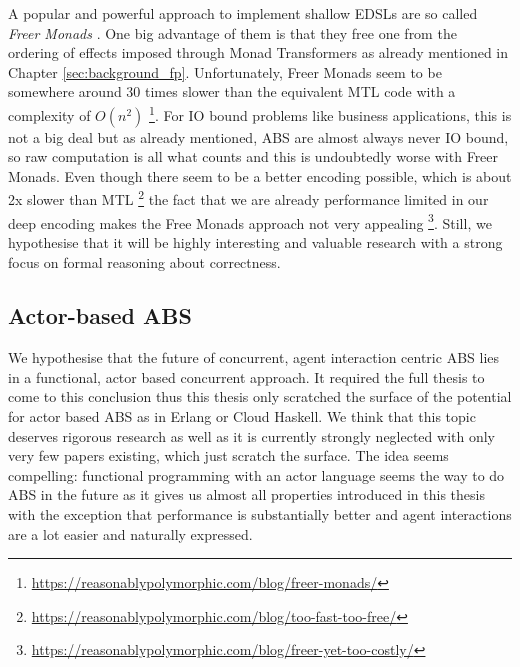 \medskip

A popular and powerful approach to implement shallow EDSLs are so called \textit{Freer Monads} \cite{rivas_notions_2014}. One big advantage of them is that they free one from the ordering of effects imposed through Monad Transformers as already mentioned in Chapter \ref{sec:background_fp}. Unfortunately, Freer Monads seem to be somewhere around 30 times slower than the equivalent MTL code with a complexity of $O(n^2)$ \footnote{\url{https://reasonablypolymorphic.com/blog/freer-monads/}}. For IO bound problems like business applications, this is not a big deal but as already mentioned, ABS are almost always never IO bound, so raw computation is all what counts and this is undoubtedly worse with Freer Monads. Even though there seem to be a better encoding possible, which is about 2x slower than MTL \footnote{\url{https://reasonablypolymorphic.com/blog/too-fast-too-free/}} the fact that we are already performance limited in our deep encoding makes the Free Monads approach not very appealing \footnote{\url{https://reasonablypolymorphic.com/blog/freer-yet-too-costly/}}. Still, we hypothesise that it will be highly interesting and valuable research with a strong focus on formal reasoning about correctness.



\subsection{Actor-based ABS}
We hypothesise that the future of concurrent, agent interaction centric ABS lies in a functional, actor based concurrent approach. It required the full thesis to come to this conclusion thus this thesis only scratched the surface of the potential for actor based ABS as in Erlang or Cloud Haskell. We think that this topic deserves rigorous research as well as it is currently strongly neglected with only very few papers existing, which just scratch the surface. The idea seems compelling: functional programming with an actor language seems the way to do ABS in the future as it gives us almost all properties introduced in this thesis with the exception that performance is substantially better and agent interactions are a lot easier and naturally expressed.

